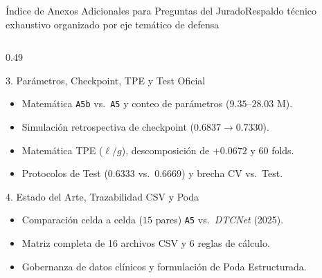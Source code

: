 \begin{frame}{\'Indice de Anexos Adicionales para Preguntas del Jurado}{Respaldo t\'ecnico exhaustivo organizado por eje tem\'atico de defensa \cite{rodas_valencia_tpe_ecog}}
\begin{columns}[T,onlytextwidth]
    \begin{column}{0.49\textwidth}
      \begin{block}{3. Par\'ametros, Checkpoint, TPE y Test Oficial}
        \tiny
        \begin{itemize}\setlength{\itemsep}{-0.5pt}
          \item \hyperlink{anexo:a5b_vs_a5_params}{} Matem\'atica \texttt{A5b} vs.\ \texttt{A5} y conteo de par\'ametros ($9.35\text{--}28.03\text{ M}$).
          \item \hyperlink{anexo:checkpoint_retrospectivo}{} Simulaci\'on retrospectiva de checkpoint ($0.6837 \to 0.7330$).
          \item \hyperlink{anexo:tpe_diagnostico}{} Matem\'atica TPE ($\ell/g$), descomposici\'on de $+0.0672$ y 60 folds.
          \item \hyperlink{anexo:protocolos_test_brecha}{} Protocolos de Test ($0.6333$ vs.\ $0.6669$) y brecha CV vs.\ Test.
        \end{itemize}
      \end{block}
      \vspace{-2.5mm}
      \begin{block}{4. Estado del Arte, Trazabilidad CSV y Poda}
        \tiny
        \begin{itemize}\setlength{\itemsep}{-0.5pt}
          \item \hyperlink{anexo:comparacion_dtcnet_dedos}{} Comparaci\'on celda a celda ($15$ pares) \texttt{A5} vs.\ \textit{DTCNet} (2025).
          \item \hyperlink{anexo:trazabilidad_csv}{} Matriz completa de 16 archivos CSV y 6 reglas de c\'alculo.
          \item \hyperlink{anexo:poda_y_privacidad}{} Gobernanza de datos cl\'inicos y formulaci\'on de Poda Estructurada.
        \end{itemize}
      \end{block}
    \end{column}
  \end{columns}
\end{frame}

